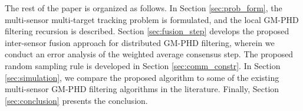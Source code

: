 The rest of the paper is organized as follows. In Section \ref{sec:prob_form}, the multi-sensor multi-target tracking problem is formulated, and the local GM-PHD filtering recursion is described. Section \ref{sec:fusion_step} develops the proposed inter-sensor fusion approach for distributed GM-PHD filtering, wherein we conduct an error analysis of the weighted average consensus step. The proposed random sampling rule is developed in Section \ref{sec:comm_constr}. In Section \ref{sec:simulation}, we compare the proposed algorithm to some of the existing multi-sensor GM-PHD filtering algorithms in the literature. Finally, Section \ref{sec:conclusion} presents the conclusion.
